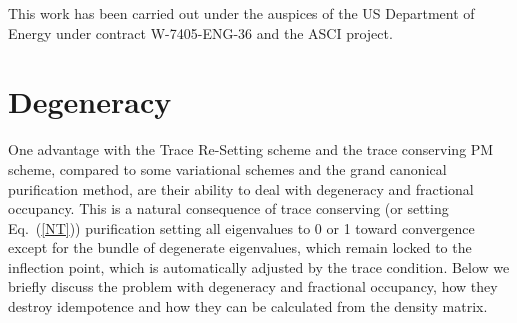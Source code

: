 \commentoutA{\documentclass[prb,aps,twocolumn,showpacs,twocolumngrid,superbib]{revtex4}}
\begin{document}
\begin{acknowledgments}
This work has been carried out under the auspices of the US Department 
of Energy under contract W-7405-ENG-36 and the ASCI project.  
\end{acknowledgments}




\appendix

\section{Degeneracy}\label{Degen}

One advantage with the Trace Re-Setting scheme and the trace
conserving PM scheme, compared to some variational schemes \cite{XLi93}
and the grand canonical purification method,
are their ability to deal with degeneracy and fractional occupancy.
This is a natural consequence of trace conserving (or setting Eq.\ (\ref{NT})) purification
setting all eigenvalues to 0 or 1 toward convergence except for the bundle of 
degenerate eigenvalues, which remain locked to the inflection point, which
is automatically adjusted by the trace condition.
Below we briefly discuss the problem with degeneracy and fractional
occupancy, how they destroy idempotence and how they can be calculated
from the density matrix.
\end{document}
